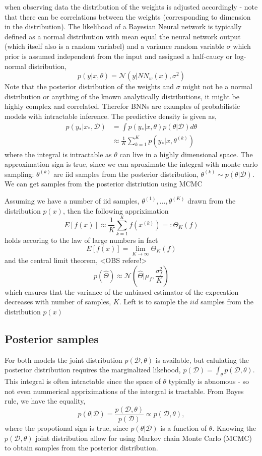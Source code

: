 when observing data the distribution of the weights is adjusted accordingly - note that 
there can be correlations between the weights (corresponding to dimension in the distribution). 
The likelihood of a Bayesian Neural network is typically defined as a normal distribution
with mean equal the neural network output (which itself also is a random variabel) and a 
variance random variable $\sigma$ which prior is assumed independent from the input and
assigned a half-caucy or log-normal distribution, 
$$p(y|x, \theta) = \mathcal{N}(y|NN_{w}(x),\sigma^2)$$
Note that the posterior distribution of the weights and $\sigma$ might not be a normal distribution
or anything of the known analytically distributions, it might be highly complex and correlated. 
Therefor BNNs are examples of probabilistic models with intractable inference. The predictive density is given as, 
\begin{align*}
    p(y_*|x_*,\mathcal{D}) &= \int p(y_*|x, \theta)p(\theta|\mathcal{D})d\theta\\
    &\approx \frac{1}{K} \sum_{k=1}^K p(y_*|x, \theta^{(k)})
\end{align*}
where the integral is intractable as $\theta$ can live in a highly dimensional space. The approximation sign
is true, since we can aproximate the integral with monte carlo sampling: $\theta^{(k)}$ are iid samples from the posterior 
distribution, $\theta^{(k)} \sim p(\theta|\mathcal{D})$. We can get samples from the posterior distriution using MCMC

\begin{testexample2}
    Assuming we have a number of iid samples, $\theta^{(1)}, \dots, \theta^{(K)}$ drawn from the
    distribution $p(x)$, then the following appriximation 
    $$E[f(x)] \approx \frac{1}{K} \sum_{k=1}^K f(x^{(k)}) =: \Theta_{K}(f)$$
    holds accoring to the law of large numbers 
    in fact $$E[f(x)] = \lim_{K \rightarrow \infty} \Theta_{K}(f)$$
    and the central limit theorem, <OBS refere!>
    $$p(\hat \Theta) \approx \mathcal{N}(\hat \Theta |\mu_f, \frac{\sigma_f^2}{K})$$
    which ensures that the variance of the unbiased estimator of the expecation decreases
    with number of samples, $K$. Left is to sample the $iid$ samples from the distribution $p(x)$
\end{testexample2}
\subsection*{Posterior samples}
For both models 
the joint distribution $p(\mathcal{D},\theta)$ is available, but calulating the posterior distribution requires the
marginalized likehood, $p(\mathcal{D}) = \int_{\theta} p(\mathcal{D},\theta)$. This integral is often intractable
since the space of $\theta$ typically is abnomous - so not even nummerical appriximations of the intergral is tractable.
From Bayes rule, we have the equality, 
$$p(\theta|\mathcal{D}) = \frac{p(\mathcal{D},\theta)}{p(\mathcal{D})} \propto
p(\mathcal{D},\theta),$$ where the propotional sign is true, since $p(\theta|\mathcal{D})$ is a
function of $\theta$. Knowing the $p(\mathcal{D},\theta)$ joint distribution allow for using Markov
chain Monte Carlo (MCMC) to obtain samples from the posterior distribution.  


